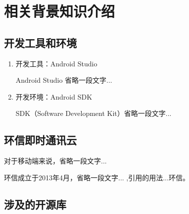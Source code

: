 \section{相关背景知识介绍}

	\subsection{开发工具和环境}
  
  	\begin{enumerate}[fullwidth,itemindent=2em,listparindent=2em]

  		\item 开发工具：Android Studio
 	
 		Android Studio 省略一段文字...
 			
		\item   开发环境：Android SDK
	
		SDK（Software Development Kit）省略一段文字...
  
  	
  	\end{enumerate}
     
    \subsection{环信即时通讯云}
    
    对于移动端来说，省略一段文字...
        
    环信成立于2013年4月，省略一段文字...   ,引用的用法...环信。
    
    \subsection{涉及的开源库}
	
